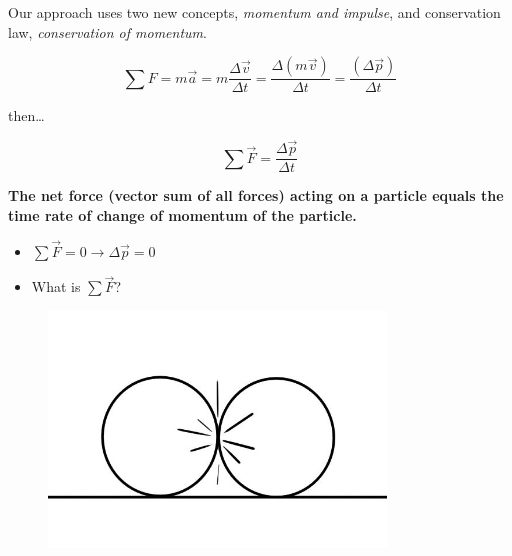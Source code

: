 \documentclass[]{beamer}
\begin{document}
\begin{frame}
    Our approach uses two new concepts, \textit{momentum and impulse}, and  conservation
    law, \textit{conservation of momentum}.

    \pause
\vspace{3mm}
    
    \begin{equation}
        \sum F=m\vec {a}=m\frac{\Delta \vec v}{\Delta t}=\frac{\Delta(m  \vec v)}{\Delta t}=\frac{( \Delta \vec p)}{\Delta t}
    \end{equation}
        

\pause
then\dots

\begin{equation}
    \sum \vec F=\frac{\Delta \vec p}{\Delta t}
\end{equation}
\pause


\textbf{The net force (vector sum of all forces) acting on a particle equals the time
rate of change of momentum of the particle.}


    \end{frame}
    
    





\begin{frame}
\begin{itemize}
    \item $\sum \vec{ F}=0\rightarrow\Delta \vec p =0$
    \pause
    \item What is $\sum \vec F$?
\end{itemize}
\pause


\begin{figure}[h!]  
    \includegraphics[width=0.8\textwidth]{images/1.jpg}

  \end{figure}




    \end{frame}
    
\end{document}
